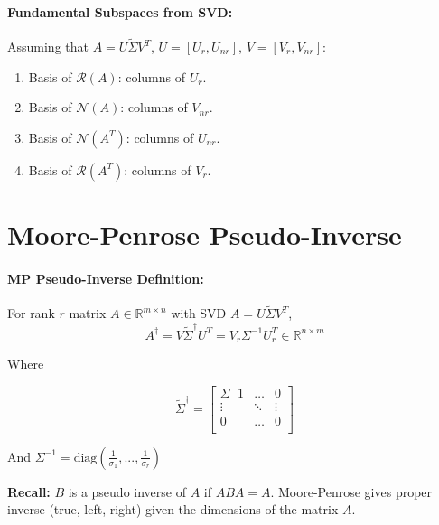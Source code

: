 \documentclass[a4paper,12pt]{report}
\def\reals{\mathbb{R}}
\begin{document}
\paragraph{Fundamental Subspaces from SVD: } Assuming that $A = U\tilde{\Sigma}V^T$, $U = [U_r, U_{nr}]$, $V = [V_r, V_{nr}]$: 
\begin{enumerate}
\item Basis of $\mathcal{R}(A)$: columns of $U_r$.
\item Basis of $\mathcal{N}(A)$: columns of $V_{nr}$.
\item Basis of $\mathcal{N}(A^T)$: columns of $U_{nr}$.
\item Basis of $\mathcal{R}(A^T)$: columns of $V_r$.
\end{enumerate}

\section{Moore-Penrose Pseudo-Inverse}

\paragraph{MP Pseudo-Inverse Definition: } For rank $r$ matrix $A\in \reals^{m\times n}$ with SVD $A = U\tilde{\Sigma}V^T$, 
\begin{equation}
	A^\dagger = V\tilde{\Sigma}^\dagger U^T = V_r\Sigma^{-1}U_r^T \in \reals^{n\times m}
\end{equation}

Where 

\begin{equation}
\tilde{\Sigma}^\dagger = 
\begin{bmatrix}
	\Sigma^-1 & \dots & 0 \\
	\vdots & \ddots & \vdots \\
	0 & \dots & 0 \\
\end{bmatrix}
\end{equation}

And $\Sigma^{-1} = \text{diag}(\frac{1}{\sigma_1}, ..., \frac{1}{\sigma_r})$

\textbf{Recall: } $B$ is a pseudo inverse of $A$ if $ABA = A$. Moore-Penrose gives proper inverse (true, left, right) given the dimensions of the matrix $A$.
\end{document}
